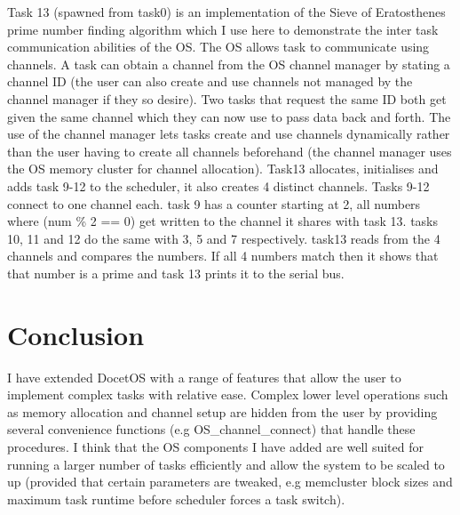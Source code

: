 \documentclass[12pt,a4paper]{article}
\begin{document}
Task 13 (spawned from task0) is an implementation of the Sieve of Eratosthenes prime number finding algorithm which I use here to demonstrate the inter task communication abilities of the OS. The OS allows task to communicate using channels. A task can obtain a channel from the OS channel manager by stating a channel ID (the user can also create and use channels not managed by the channel manager if they so desire). Two tasks that request the same ID both get given the same channel which they can now use to pass data back and forth. The use of the channel manager lets tasks create and use channels dynamically rather than the user having to create all channels beforehand (the channel manager uses the OS memory cluster for channel allocation). Task13 allocates, initialises and adds task 9-12 to the scheduler, it also creates 4 distinct channels. Tasks 9-12 connect to one channel each. task 9 has a counter starting at 2, all numbers where (num \% 2 == 0) get written to the channel it shares with task 13. tasks 10, 11 and 12 do the same with 3, 5 and 7 respectively. task13 reads from the 4 channels and compares the numbers. If all 4 numbers match then it shows that that number is a prime and task 13 prints it to the serial bus.

\section{Conclusion}
I have extended DocetOS with a range of features that allow the user to implement complex tasks with relative ease. Complex lower level operations such as memory allocation and channel setup are hidden from the user by providing several convenience functions (e.g OS\_channel\_connect) that handle these procedures. I think that the OS components I have added are well suited for running a larger number of tasks efficiently and allow the system to be scaled to up (provided that certain parameters are tweaked, e.g memcluster block sizes and maximum task runtime before scheduler forces a task switch).
\end{document}
